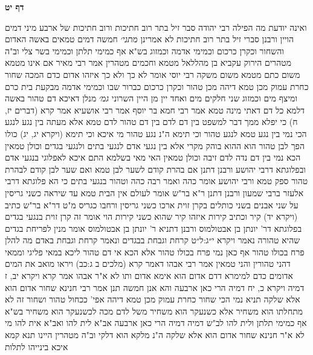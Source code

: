 \documentclass[12pt, openany]{book}
\newcommand{\sethebfont}{
\fontsize{10.5pt}{21.0pt} \selectfont
}
\newcommand{\twocol}[1]{
	{\sethebfont \begin{multicols}{2}
			#1
	\end{multicols}}	
}
\newcommand{\sectname}{}
\newcommand{\newsection}[1]{
	\addcontentsline{toc}{section}{#1}
	\renewcommand{\sectname}{#1}	
	\vspace{-\baselineskip}
	\begin{center}
		\textbf{%
\fontsize{16pt}{16pt}\selectfont
			#1}
	\end{center}
	\vspace{-\baselineskip}
	\nopagebreak
}
\begin{document}
\newsection{דף יט}
\twocol{ואינה יודעת מה הפילה  רבי יהודה סבר  זיל בתר רוב חתיכות ורוב חתיכות של ארבע מיני דמים הויין  ורבנן סברי  זיל בתר רוב חתיכות לא אמרינן
{\large\emph{מתני׳}} חמשה דמים טמאים באשה האדום והשחור וכקרן כרכום וכמימי אדמה וכמזוג  בש"א  אף כמימי תלתן וכמימי בשר צלי וב"ה מטהרים  הירוק עקביא בן מהללאל מטמא וחכמים מטהרין 
אמר רבי מאיר  אם אינו מטמא משום כתם מטמא משום משקה  רבי יוסי אומר  לא כך ולא כך 
איזהו אדום  כדם המכה  שחור  כחרת  עמוק מכן טמא דיהה מכן טהור  וכקרן כרכום  כברור שבו 
וכמימי אדמה  מבקעת בית כרם ומיצף מים וכמזוג  שני חלקים מים ואחד יין מן היין השרוני
{\large\emph{גמ׳}} מנלן דאיכא דם טהור באשה דלמא כל דם דאתי מינה טמא 
אמר רבי חמא בר יוסף אמר רבי אושעיא אמר קרא  (דברים יז, ח) כי יפלא ממך דבר למשפט בין דם לדם בין דם טהור לדם טמא 
אלא מעתה בין נגע לנגע הכי נמי בין נגע טמא לנגע טהור  וכי תימא  ה"נ נגע טהור מי איכא  וכי תימא  (ויקרא יג, יג) כולו הפך לבן טהור הוא ההוא בוהק מקרי 
אלא  בין נגעי אדם לנגעי בתים ולנגעי בגדים וכולן טמאין הכא נמי בין דם נדה לדם זיבה וכולן טמאין 
האי מאי  בשלמא התם איכא לאפלוגי בנגעי אדם ובפלוגתא דרבי יהושע ורבנן
דתנן אם בהרת קודם לשער לבן טמא ואם שער לבן קודם לבהרת טהור ספק טמא ורבי יהושע אומר  כהה  ואמר רבה  כהה וטהור 
בנגעי בתים כי הא פלוגתא דרבי אלעזר ברבי שמעון ורבנן דתנן ר"א בר"ש אומר  לעולם אין הבית טמא עד שיראה כשני גריסין על שני אבנים בשני כותלים בקרן זוית ארכו כשני גריסין ורחבו כגריס 
מ"ט דר"א בר"ש  כתיב (ויקרא יד) קיר  וכתיב קירות איזהו קיר שהוא כשני קירות הוי אומר  זה קרן זוית 
בנגעי בגדים בפלוגתא דר' יונתן בן אבטולמוס ורבנן  דתניא ר' יונתן בן אבטולמוס אומר  מנין לפריחת בגדים שהיא טהורה
נאמר {ויקרא י״ג:ל״ט } קרחת וגבחת בבגדים ונאמר קרחת וגבחת באדם
מה להלן פרח בכולו טהור אף כאן נמי פרח בכולו טהור 
אלא הכא אי דם טהור ליכא במאי פליגי 
וממאי דהני טהורין והני טמאין  אמר רבי אבהו דאמר קרא  (מלכים ב ג:כב) ויראו מואב את המים אדומים כדם  למימרא דדם אדום הוא אימא אדום ותו לא 
א"ר אבהו  אמר קרא {ויקרא יב, ז} דמיה {ויקרא כ, יח} דמיה הרי כאן ארבעה 
והא אנן חמשה תנן  אמר רבי חנינא  שחור אדום הוא אלא שלקה 
תניא נמי הכי  שחור כחרת עמוק מכן טמא דיהה אפי' ככחול טהור  ושחור זה לא מתחלתו הוא משחיר אלא כשנעקר הוא משחיר משל לדם מכה לכשנעקר הוא משחיר
בש"א  אף כמימי תלתן ולית להו לב"ש דמיה דמיה הרי כאן ארבעה 
אב"א  לית להו  ואב"א  אית להו מי לא א"ר חנינא שחור אדום הוא אלא שלקה ה"נ מלקא הוא דלקי
וב"ה מטהרין היינו תנא קמא 
איכא בינייהו
לתלות 
}
\end{document}
